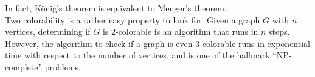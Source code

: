 In fact, K\"onig's theorem is equivalent to Menger's theorem. \\
Two colorability is a rather easy property to look for. Given a graph $G$ with $n$ vertices, determining if $G$ is 2-colorable is an algorithm that runs in $n$ steps. However, the algorithm to check if a graph is even 3-colorable runs in exponential time with respect to the number of vertices, and is one of the hallmark ``NP-complete'' problems. 


\begin{comment}
\subsection{Coloring Embedded Graphs}
Historically, the problem of coloring planar graphs has been a rich field, motivated by the observation that an atlas can be colored with 4 colors. This theorem was outside the reach of mathematicians until the use of a computer program to verify a large number of edge cases. In this course, we will prove some results in the vicinity of the 4 color theorem. We start with a surprisingly useful fact about planar graphs:
\begin{lemma}
 Every simple planar graph contains a vertex of degree 5 or less.\label{lemma:lowdegree}
\end{lemma}
\begin{proof}
 We have the following inequality from before:
 \[|E|\leq 3|V|-6\]
 Assume that every vertex has degree 6 tells us $|E|\geq 3|V|$. This is a contradiction. 
\end{proof}
This allows us to run induction arguments on planar graphs where we induct on the number of vertices, and every time we remove a vertex we can choose that vertex to be of low degree. 
\begin{corollary}
 Every planar graph is 6 colorable. 
\end{corollary}
\begin{proof}
 We prove by induction on the number of vertices. \\
 Let $G$ be our graph. By Lemma \ref{lemma:lowdegree}, we can  choose to remove a vertex $v$ of degree 5. The induction hypothesis tells us that there exists a 6-coloring for $G\setminus v$. Since $v$ has degree 5, there is a color which is not used in $N(v)$. Color $v$ with that color to get a valid coloring for $G\setminus v$. 
\end{proof}


\end{comment}
